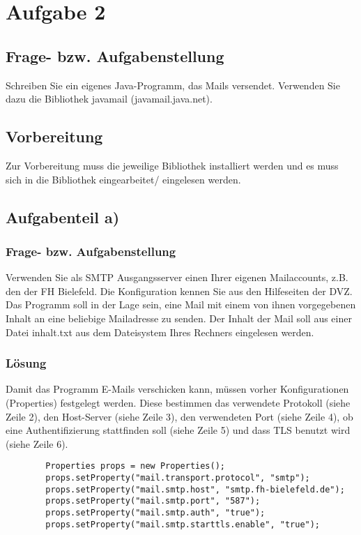 \newcommand{\env}[1]{\texttt{#1}}
\newcommand{\command}[1]{\texttt{#1}}
\newcommand{\package}[1]{\texttt{\itshape#1}}
\newcommand{\engl}[1]{(engl: \textit{#1})\xspace}
\newpage

\section{Aufgabe 2}

\subsection{Frage- bzw. Aufgabenstellung}
Schreiben Sie ein eigenes Java-Programm, das Mails versendet. Verwenden Sie dazu die Bibliothek javamail (javamail.java.net). 

\subsection{Vorbereitung}
Zur Vorbereitung muss die jeweilige Bibliothek installiert werden und es muss sich in die Bibliothek eingearbeitet/ eingelesen werden.

\subsection{Aufgabenteil a)}
\subsubsection{Frage- bzw. Aufgabenstellung}

Verwenden Sie als SMTP Ausgangsserver einen Ihrer eigenen Mailaccounts, z.B. den der FH Bielefeld. Die Konfiguration kennen Sie aus den Hilfeseiten der DVZ. Das Programm soll in der Lage sein, eine Mail mit einem von ihnen vorgegebenen Inhalt an eine beliebige Mailadresse zu senden. Der Inhalt der Mail soll aus einer Datei inhalt.txt aus dem Dateisystem Ihres Rechners eingelesen werden.

\subsubsection{Lösung}
Damit das Programm E-Mails verschicken kann, müssen vorher Konfigurationen (Properties) festgelegt werden. Diese bestimmen das verwendete Protokoll (siehe Zeile 2), den Host-Server (siehe Zeile 3), den verwendeten Port (siehe Zeile 4), ob eine Authentifizierung stattfinden soll (siehe Zeile 5) und dass TLS benutzt wird (siehe Zeile 6).
\begin{lstlisting}
		Properties props = new Properties();
		props.setProperty("mail.transport.protocol", "smtp");
		props.setProperty("mail.smtp.host", "smtp.fh-bielefeld.de");
		props.setProperty("mail.smtp.port", "587");
		props.setProperty("mail.smtp.auth", "true");
		props.setProperty("mail.smtp.starttls.enable", "true");
\end{lstlisting}


